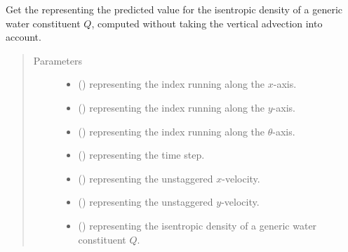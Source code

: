 \documentclass[letterpaper,10pt,english]{sphinxmanual}
\begin{document}
\begin{fulllineitems}
\begin{fulllineitems}
\label{\detokenize{api:dycore.flux_isentropic_maccormack.FluxIsentropicMacCormack._get_maccormack_horizontal_predicted_value_constituent}}
Get the  representing the predicted value for the isentropic density of a generic
water constituent \(Q\), computed without taking the vertical advection into account.
\begin{quote}\begin{description}
\item[{Parameters}] \leavevmode\begin{itemize}
\item {} 
 () \textendash{}  representing the index running along the \(x\)-axis.

\item {} 
 () \textendash{}  representing the index running along the \(y\)-axis.

\item {} 
 () \textendash{}  representing the index running along the \(\theta\)-axis.

\item {} 
 () \textendash{}  representing the time step.

\item {} 
 () \textendash{}  representing the unstaggered \(x\)-velocity.

\item {} 
 () \textendash{}  representing the unstaggered \(y\)-velocity.

\item {} 
 () \textendash{}  representing the isentropic density of a generic water constituent \(Q\).


\end{itemize}
\end{description}
\end{quote}
\end{fulllineitems}
\end{fulllineitems}
\end{document}
